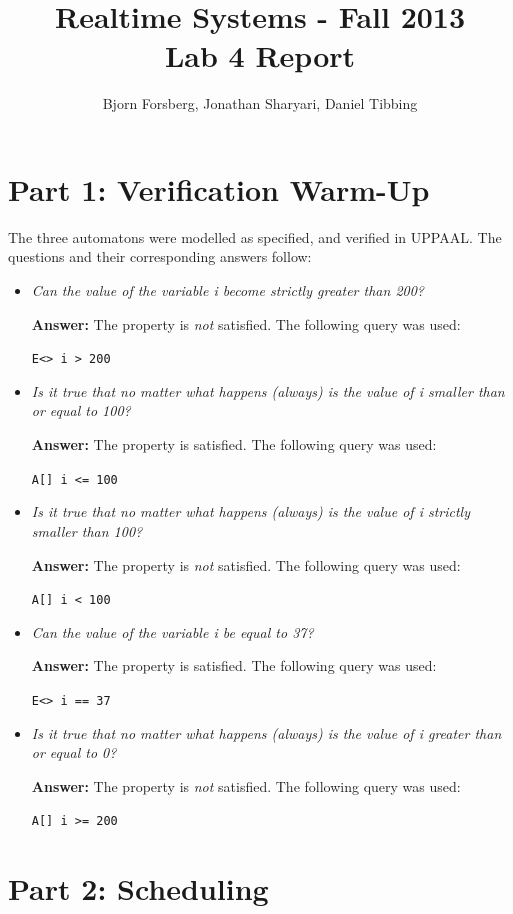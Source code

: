 \documentclass[a4paper,10pt]{article}
\title{Realtime Systems - Fall 2013 \\ \textbf{Lab 4 Report}}
\author{Bjorn Forsberg, Jonathan Sharyari, Daniel Tibbing}
\newcommand{\answer}{\textbf{Answer: }}
\newcommand{\query}[1]{\lstinline{#1}}
\begin{document}
\maketitle

\section*{Part 1: Verification Warm-Up}

The three automatons were modelled as specified, and verified in UPPAAL. The questions and their corresponding answers follow:

\begin{itemize}
  \item \emph{Can the value of the variable i become strictly greater than 200?}
    
    \answer The property is \emph{not} satisfied. The following query was used: 

    \query{E<> i > 200}
  \item \emph{Is it true that no matter what happens (always) is the value of i smaller than or equal to 100?}
    
    \answer The property is satisfied. The following query was used:

    \query{A[] i <= 100}
  \item \emph{Is it true that no matter what happens (always) is the value of i strictly smaller than 100?}
    
    \answer The property is \emph{not} satisfied. The following query was used:

    \query{A[] i < 100}
  \item \emph{Can the value of the variable i be equal to 37?}
    
    \answer The property is satisfied. The following query was used:

    \query{E<> i == 37}
  \item \emph{Is it true that no matter what happens (always) is the value of i greater than or equal to 0?}
    
    \answer The property is \emph{not} satisfied. The following query was used:

    \query{A[] i >= 200}
\end{itemize}

\section*{Part 2: Scheduling}
\end{document}
